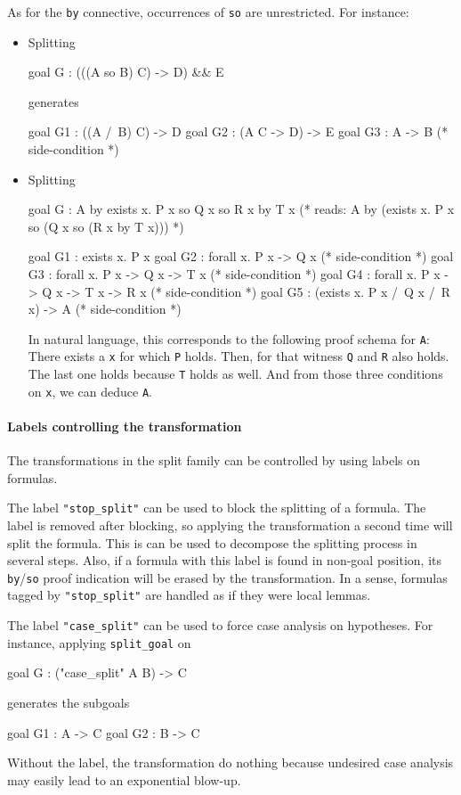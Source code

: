 \begin{description}
  As for the \texttt{by} connective, occurrences of \texttt{so} are unrestricted.
  For instance:
  \begin{itemize}
  \item Splitting
\begin{whycode}
goal G : (((A so B) \/ C) -> D) && E
\end{whycode}
generates
\begin{whycode}
goal G1 : ((A /\ B) \/ C) -> D
goal G2 : (A \/ C -> D) -> E
goal G3 : A -> B               (* side-condition *)
\end{whycode}
\item Splitting
\begin{whycode}
goal G : A by exists x. P x so Q x so R x by T x
(* reads: A by (exists x. P x so (Q x so (R x by T x))) *)
\end{whycode}
\begin{whycode}
goal G1 : exists x. P x
goal G2 : forall x. P x -> Q x               (* side-condition *)
goal G3 : forall x. P x -> Q x -> T x        (* side-condition *)
goal G4 : forall x. P x -> Q x -> T x -> R x (* side-condition *)
goal G5 : (exists x. P x /\ Q x /\ R x) -> A (* side-condition *)
\end{whycode}
In natural language, this corresponds to the following proof schema
for \verb|A|: There exists a \verb|x| for which \verb|P| holds. Then,
for that witness \verb|Q| and \verb|R| also holds. The last one holds
because \verb|T| holds as well. And from those three conditions on
\verb|x|, we can deduce \verb|A|.
\end{itemize}

\paragraph{Labels controlling the transformation}

The transformations in the split family can be controlled by using
labels on formulas.

The label \verb|"stop_split"| can be used to block the splitting of a
formula.  The label is removed after blocking, so applying the
transformation a second time will split the formula. This is can be
used to decompose the splitting process in several steps. Also, if a
formula with this label is found in non-goal position, its
\texttt{by}/\texttt{so} proof indication will be erased by the
transformation. In a sense, formulas tagged by \verb|"stop_split"| are
handled as if they were local lemmas.

The label \verb|"case_split"| can be used to force case analysis on hypotheses.
For instance, applying \texttt{split\_goal} on
\begin{whycode}
goal G : ("case_split" A \/ B) -> C
\end{whycode}
generates the subgoals
\begin{whycode}
goal G1 : A -> C
goal G2 : B -> C
\end{whycode}
Without the label, the transformation do nothing because undesired case analysis
may easily lead to an exponential blow-up.


\end{description}
